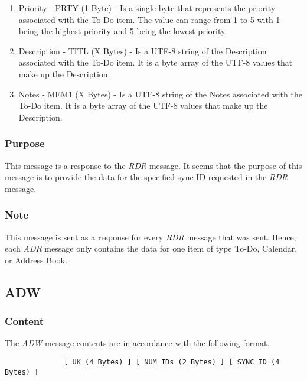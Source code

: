 \begin{enumerate}
              \item Priority - PRTY (1 Byte) - Is a single byte that
              represents the priority associated with the To-Do item. The value
              can range from 1 to 5 with 1 being the highest priority and 5
              being the lowest priority.

              \item Description - TITL (X Bytes) - Is a UTF-8 string of the
              Description associated with the To-Do item. It is a byte array of
              the UTF-8 values that make up the Description.

              \item Notes - MEM1 (X Bytes) - Is a UTF-8 string of the Notes
              associated with the To-Do item. It is a byte array of the UTF-8
              values that make up the Description.
            \end{enumerate}

            \subsubsection{Purpose}

            This message is a response to the \emph{RDR} message. It seems
            that the purpose of this message is to provide the data for the
            specified sync ID requested in the \emph{RDR} message.

            \subsubsection{Note}

            This message is sent as a response for every \emph{RDR} message
            that was sent. Hence, each \emph{ADR} message only contains the
            data for one item of type To-Do, Calendar, or Address Book.

        \subsection{ADW}

            \subsubsection{Content}

            The \emph{ADW} message contents are in accordance with the
            following format.

            \begin{verbatim}
              [ UK (4 Bytes) ] [ NUM IDs (2 Bytes) ] [ SYNC ID (4 Bytes) ]
            \end{verbatim}

